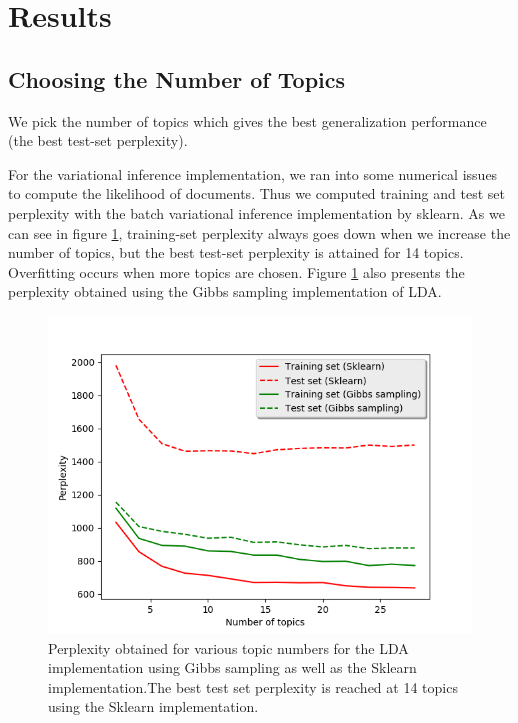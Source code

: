 \documentclass{article}
\begin{document}
\section{Results}

\subsection{Choosing the Number of Topics}
We pick the number of topics which gives the best generalization performance (the best test-set perplexity). 

For the variational inference implementation, we ran into some numerical issues to compute the likelihood of documents. Thus we computed training and test set perplexity with the batch variational inference implementation by sklearn. As we can see in figure \ref{perplexity}, training-set perplexity always goes down when we increase the number of topics, but the best test-set perplexity is attained for 14 topics. Overfitting occurs when more topics are chosen. Figure \ref{perplexity} also presents the perplexity obtained using the Gibbs sampling implementation of LDA.


\begin{figure}[ht]
\begin{center}
\centerline{\includegraphics[width=\columnwidth]{perplexity}}
\caption{Perplexity obtained for various topic numbers for the LDA implementation using Gibbs sampling as well as the Sklearn implementation.The best test set perplexity is reached at 14 topics using the Sklearn implementation.}
\label{perplexity}
\end{center}
\vskip -0.2in
\end{figure} 
\end{document}
